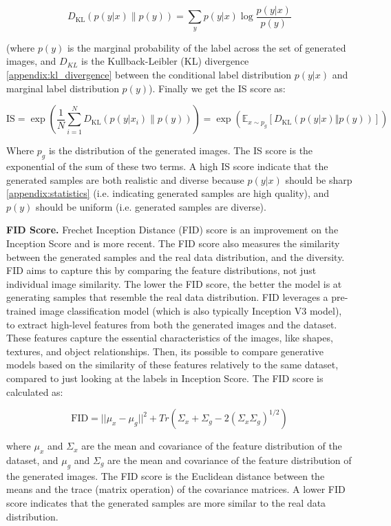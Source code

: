 \[
    D_{\text{KL}}(p(y|x) \| p(y)) = \sum_{y} p(y|x) \log \frac{p(y|x)}{p(y)}
\]

(where $p(y)$ is the marginal probability of the label across the set of generated images, and $D_{KL}$ is the Kullback-Leibler (KL) divergence \ref{appendix:kl_divergence} between the conditional label distribution $p(y|x)$ and marginal label distribution $p(y)$). Finally we get the IS score as:

\[
    \text{IS} = \exp \left( \frac{1}{N} \sum_{i=1}^{N} D_{\text{KL}}(p(y|x_i) \| p(y)) \right) = \exp(\mathbb{E}_{x \sim p_g} \left[ D_{\text{KL}} \left( p(y | x) \Vert p(y) \right) \right])
\]

Where $p_g$ is the distribution of the generated images. The IS score is the exponential of the sum of these two terms. A high IS score indicate that the generated samples are both realistic and diverse because $p(y|x)$ should be sharp \ref{appendix:statistics} (i.e. indicating generated samples are high quality), and $p(y)$ should be uniform (i.e. generated samples are diverse).






\textbf{FID Score.} Frechet Inception Distance (FID) score \cite{fid_score} is an improvement on the Inception Score and is more recent. The FID score also measures the similarity between the generated samples and the real data distribution, and the diversity. FID aims to capture this by comparing the feature distributions, not just individual image similarity. The lower the FID score, the better the model is at generating samples that resemble the real data distribution. FID leverages a pre-trained image classification model (which is also typically Inception V3 model), to extract high-level features from both the generated images and the dataset. These features capture the essential characteristics of the images, like shapes, textures, and object relationships. Then, its possible to compare generative models based on the similarity of these features relatively to the same dataset, compared to just looking at the labels in Inception Score. The FID score is calculated as:

\begin{equation}
    \text{FID} = ||\mu_x - \mu_g||^2 + Tr(\Sigma_x + \Sigma_g - 2(\Sigma_x\Sigma_g)^{1/2})
    \label{eq:fid_score}
\end{equation}

where $\mu_x$ and $\Sigma_x$ are the mean and covariance of the feature distribution of the dataset, and $\mu_g$ and $\Sigma_g$ are the mean and covariance of the feature distribution of the generated images. The FID score is the Euclidean distance between the means and the trace (matrix operation) of the covariance matrices. A lower FID score indicates that the generated samples are more similar to the real data distribution.

